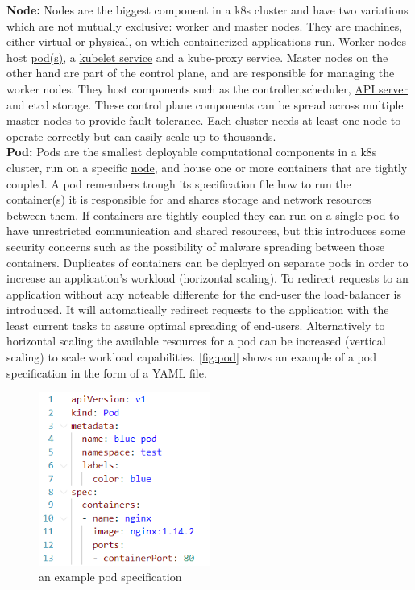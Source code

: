\textbf{Node:} \label{comp:node} Nodes are the biggest component in a \acrshort{k8s} cluster and have two variations which are not mutually exclusive: worker and master nodes. They are machines, either virtual or physical, on which containerized applications run. Worker nodes host \hyperref[comp:pod]{pod(s)}, a \hyperref[comp:kubelet]{kubelet service} and a kube-proxy service. Master nodes on the other hand are part of the control plane, and are responsible for managing the worker nodes. They host components such as the controller,scheduler, \hyperref[comp:apiserver]{API server} and etcd storage. These control plane components can be spread across multiple master nodes to provide fault-tolerance. Each cluster needs at least one node to operate correctly but can easily scale up to thousands.  \cite{node}
\\[10pt]

\textbf{Pod:} \label{comp:pod} Pods are the smallest deployable computational components in a \acrshort{k8s} cluster, run on a specific \hyperref[comp:node]{node}, and house one or more containers that are tightly coupled. A pod remembers trough its specification file how to run the container(s) it is responsible for and shares storage and network resources between them. If containers are tightly coupled they can run on a single pod to have unrestricted communication and shared resources, but this introduces some security concerns such as the possibility of malware spreading between those containers. Duplicates of containers can be deployed on separate pods  in order to increase an application's workload (horizontal scaling). To redirect requests to an application without any noteable differente for the end-user the load-balancer is introduced. It will automatically redirect requests to the application with the least current tasks to assure optimal spreading of end-users. Alternatively to horizontal scaling the available resources for a pod can be increased (vertical scaling) to scale workload capabilities. \autoref{fig:pod} shows an example of a pod specification in the form of a YAML file. \cite{pod}
\\[10pt]

\begin{figure}[htbp]
  \centering
  \includegraphics[width=0.5\textwidth]{images/pod.png} 
  \caption{an example pod specification}
  \label{fig:pod}
\end{figure}

